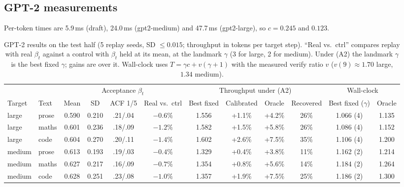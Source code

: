 \documentclass[11pt,letterpaper]{article}
\begin{document}
\subsection{GPT-2 measurements}
Per-token times are 5.9\,ms (draft), 24.0\,ms (gpt2-medium) and 47.7\,ms (gpt2-large), so $c=0.245$ and $0.123$. \begin{table}[t]
\centering\footnotesize\setlength{\tabcolsep}{4pt}
\caption{GPT-2 results on the test half (5 replay seeds, SD $\le0.015$; throughput in tokens per target step). ``Real vs.\ ctrl'' compares replay with real $\beta_t$ against a control with $\beta_t$ held at its mean, at the landmark $\gamma$ (3 for large, 2 for medium). Under (A2) the landmark $\gamma$ is the best fixed $\gamma$; gains are over it. Wall-clock uses $T=\gamma c+v(\gamma+1)$ with the measured verify ratio $v$ ($v(9)\approx1.70$ large, $1.34$ medium).}
\begin{tabular}{@{}llcccc@{\quad}cccc@{\quad}cc@{}}
\toprule
& & \multicolumn{4}{c}{Acceptance $\beta_t$} & \multicolumn{4}{c}{Throughput under (A2)} & \multicolumn{2}{c}{Wall-clock}\\
\cmidrule(lr){3-6}\cmidrule(lr){7-10}\cmidrule(l){11-12}
Target & Text & Mean & SD & ACF 1/5 & Real vs.\ ctrl & Best fixed & Calibrated & Oracle & Recovered & Best fixed ($\gamma$) & Oracle\\
\midrule
large & prose & 0.590 & 0.210 & .21/.04 & $-0.6\%$ & 1.556 & +1.1\% & +4.2\% & 26\% & 1.066 (4) & 1.135\\
large & maths & 0.601 & 0.236 & .18/.09 & $-1.2\%$ & 1.582 & +1.5\% & +5.8\% & 26\% & 1.086 (4) & 1.152\\
large & code & 0.604 & 0.270 & .20/.11 & $-1.4\%$ & 1.602 & +2.6\% & +7.5\% & 35\% & 1.106 (4) & 1.200\\
medium & prose & 0.613 & 0.193 & .19/.03 & $-0.4\%$ & 1.329 & +0.4\% & +3.8\% & 11\% & 1.162 (2) & 1.214\\
medium & maths & 0.627 & 0.217 & .16/.09 & $-0.7\%$ & 1.354 & +0.8\% & +5.6\% & 14\% & 1.184 (2) & 1.264\\
medium & code & 0.628 & 0.251 & .23/.08 & $-1.0\%$ & 1.357 & +1.9\% & +7.5\% & 25\% & 1.186 (2) & 1.300\\
\bottomrule
\end{tabular}
\end{table}
\end{document}
